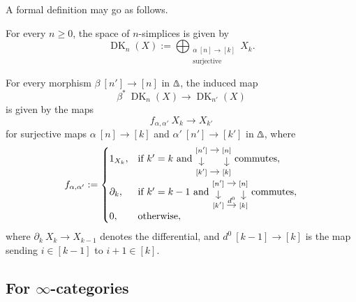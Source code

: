 \begin{construction}
\begin{center}
    \end{center}

    A formal definition may go as follows. 
    \begin{itms}
        \item For every $n\geq0$, the space of $n$-simplices is given by
        \[\operatorname{DK}_n(X):=\bigoplus_{\substack{\alpha\:[n]\to[k]\\\text{surjective}}}X_k.\]
        \item For every morphism $\beta\:[n']\to[n]$ in $\bfDelta$,
        the induced map
        \[\beta^*\:\operatorname{DK}_{n}(X)\to\operatorname{DK}_{n'}(X)\]
        is given by the maps 
        \[f_{\alpha,\alpha'}\:X_k\to X_{k'}\]
        for surjective maps $\alpha\:[n]\to[k]$ and $\alpha'\:[n']\to[k']$ in $\bfDelta$,
        where 
        \[f_{\alpha,\alpha'}:=\begin{cases}
            1_{X_k}, & \text{if }k'=k\text{ and }
            \begin{tikzcd}[cramped, sep=.9em]
                \scriptstyle[n']\ar[r]\ar[d] & \scriptstyle[n]\ar[d] \\{}
                \scriptstyle[k']\ar[r] & \scriptstyle[k]
            \end{tikzcd}\text{ commutes},\\[15pt]
            \partial_k, & \text{if }k'=k-1\text{ and }
            \begin{tikzcd}[cramped, sep=.9em]
                \scriptstyle[n']\ar[r]\ar[d] & \scriptstyle[n]\ar[d] \\{}
                \scriptstyle[k']\ar[r,"d^0"] & \scriptstyle[k]
            \end{tikzcd}\text{ commutes},\\
            0, & \text{otherwise},
        \end{cases}\]
        where $\partial_k\:X_k\to X_{k-1}$ denotes the differential,
        and $d^0\:[k-1]\to[k]$ is the map sending $i\in[k-1]$ to $i+1\in[k]$. \varqed
    \end{itms}
\end{construction}

\tbc

\subsection{For \texorpdfstring{$\infty$}{∞}-categories}

\nyw
